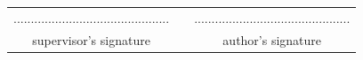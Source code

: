 \documentclass[a4paper,11pt,twoside]{report}
\theoremstyle{definition}
\begin{document}
\sloppy
{}




\thispagestyle{empty}\newpage
\null

\vfill

\begin{center}
\begin{tabular}[t]{ccc}
............................................. & \hspace*{100pt} & .............................................\\
supervisor's signature & \hspace*{100pt} & author's signature
\end{tabular}
\end{center}



\end{document}
